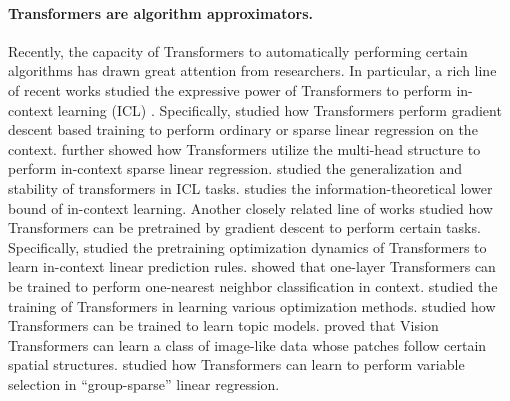 \paragraph{Transformers are algorithm approximators.} Recently, the capacity of Transformers to automatically performing certain algorithms has drawn great attention from researchers. In particular, a rich line of recent works studied the expressive power of Transformers to perform in-context learning (ICL) \citep{akyurek2022learning,bai2024transformers,abernethy2024mechanism,li2023transformers2,jeon2024informationtheoretic}. Specifically, \citet{akyurek2022learning,bai2024transformers,abernethy2024mechanism} studied how Transformers perform gradient descent based training to perform ordinary or sparse linear regression on the context. \citet{chen2024transformers} further showed how Transformers utilize the multi-head structure to perform in-context sparse linear regression.  \citet{li2023transformers2} studied the generalization and stability of transformers in ICL tasks. \citet{jeon2024informationtheoretic} studies the information-theoretical lower bound of in-context learning. Another closely related line of works studied how Transformers can be pretrained by gradient descent to perform certain tasks. Specifically, \citet{zhang2023trained,huang2023context,chen2024training} studied the pretraining optimization dynamics of Transformers to learn in-context linear prediction rules. \citet{li2024one} showed that one-layer Transformers can be trained to perform one-nearest neighbor classification in context. \citet{ahn2024transformers,giannou2024well} studied the training of Transformers in learning various optimization methods. \citet{li2023transformers}  studied how Transformers can be trained to learn topic models. \citet{jelassi2022vision} proved that Vision Transformers can learn a class of image-like data whose patches follow certain spatial structures. \citet{zhang2025transformer} studied how Transformers can learn to perform variable selection in ``group-sparse'' linear regression.

